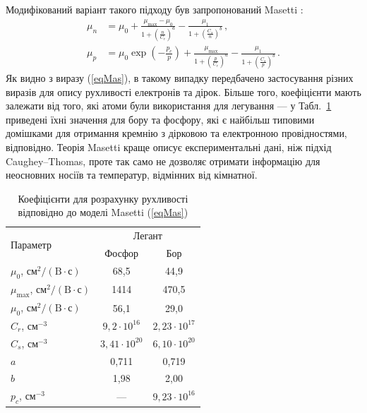 \documentclass[10pt,a5paper,titlepage,oneside]{book}
\numberwithin{equation}{part}
\begin{document}
Модифікований варіант такого підходу був запропонований Masetti \cite{Masetti1983}:
\begin{equation}\label{eqMas}
\begin{aligned}
    \mu_n &=\mu_0+\frac{\mu_\mathrm{max}-\mu_0}{1+\left(\frac{n}{C_r}\right)^a}-\frac{\mu_1}{1+\left(\frac{C_s}{n}\right)^b}\,, \\
   \mu_p &=\mu_0\exp\left(-\frac{p_c}{p}\right)+\frac{\mu_\mathrm{max}}{1+\left(\frac{p}{C_r}\right)^a}-\frac{\mu_1}{1+\left(\frac{C_s}{p}\right)^b}\,.
\end{aligned}
\end{equation}
Як видно з виразу (\ref{eqMas}), в такому випадку передбачено застосування різних виразів для опису рухливості електронів та дірок.
Більше того, коефіцієнти мають залежати від того, які атоми були використання для легування --- у Табл.~\ref{tblMas} приведені
їхні значення для бору та фосфору, які є найбільш типовими домішками для отримання кремнію з дірковою та електронною провідностями, відповідно.
Теорія Masetti краще описує експериментальні дані, ніж підхід  Caughey--Thomas, проте так само не дозволяє отримати інформацію для неосновних носіїв та
температур, відмінних від кімнатної.

\begin{table}
\caption{Коефіцієнти для розрахунку рухливості відповідно до моделі Masetti (\ref{eqMas})}
\label{tblMas}
\centering
\begin{tabular}{|l|c|c|}
\hline
\multirow{2}{*}{Параметр} & \multicolumn{2}{c|}{Легант} \\
\cline{2-3}
&Фосфор&Бор\\
\hline
$\mu_0$, $\text{см}^2/(\text{B}\cdot\text{с})$&68,5&44,9\\
\hline
$\mu_\mathrm{max}$, $\text{см}^2/(\text{B}\cdot\text{с})$&1414&470,5\\
\hline
$\mu_0$, $\text{см}^2/(\text{B}\cdot\text{с})$&56,1&29,0\\
\hline
$C_r$, см$^{-3}$&$9,2\cdot10^{16}$&$2,23\cdot10^{17}$\\
\hline
$C_s$, см$^{-3}$&$3,41\cdot10^{20}$&$6,10\cdot10^{20}$\\
\hline
$a$&0,711&0,719\\
\hline
$b$&1,98&2,00\\
\hline
$p_c$, см$^{-3}$&---&$9,23\cdot10^{16}$\\
\hline
\end{tabular}
\end{table}
\end{document}
